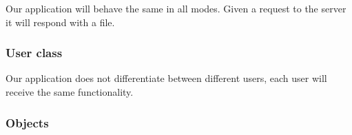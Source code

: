 Our application will behave the same in all modes.
Given a  request to the server it will respond with a file.


\subsubsection{User class}

Our application does not differentiate between different users, each user will receive the same functionality.


\subsubsection{Objects}


